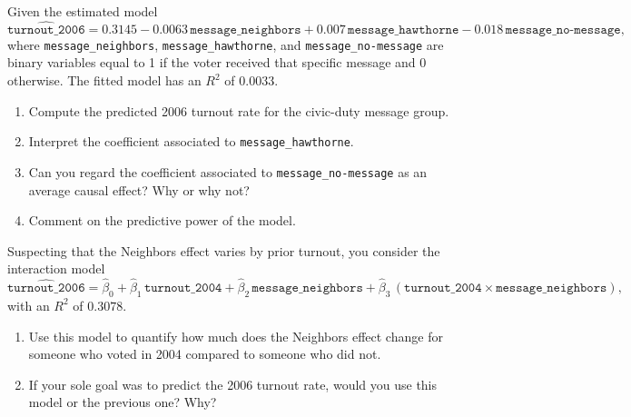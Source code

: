 \documentclass[11pt]{exam}
\begin{document}
\begin{questions}
\question[4] Given the estimated model
\[
\widehat{\texttt{turnout\_2006}} = 0.3145 - 0.0063\,\texttt{message\_neighbors} + 0.007\,\texttt{message\_hawthorne} - 0.018\,\texttt{message\_no-message},
\]
where \texttt{message\_neighbors}, \texttt{message\_hawthorne}, and \texttt{message\_no-message} are binary variables equal to 1 if the voter received that specific message and 0 otherwise. The fitted model has an $R^2$ of $0.0033$.
\begin{enumerate}[label=(\alph*)]
  \item Compute the predicted 2006 turnout rate for the civic-duty message group.
  \item Interpret the coefficient associated to \texttt{message\_hawthorne}.
  \item Can you regard the coefficient associated to \texttt{message\_no-message} as an average causal effect? Why or why not?
  \item Comment on the predictive power of the model.
\end{enumerate}
Suspecting that the Neighbors effect varies by prior turnout, you consider the interaction model
\[
\widehat{\texttt{turnout\_2006}} = \widehat{\beta}_0 + \widehat{\beta}_1\,\texttt{turnout\_2004} + \widehat{\beta}_2\,\texttt{message\_neighbors} + \widehat{\beta}_3\,(\texttt{turnout\_2004}\times\texttt{message\_neighbors}),
\]
with an $R^2$ of $0.3078$.
\begin{enumerate}[label=(\alph*)]
  \item[(e)] Use this model to quantify how much does the Neighbors effect change for someone who voted in 2004 compared to someone who did not.
  \item[(f)] If your sole goal was to predict the 2006 turnout rate, would you use this model or the previous one? Why?
\end{enumerate}


\end{questions}
\end{document}
